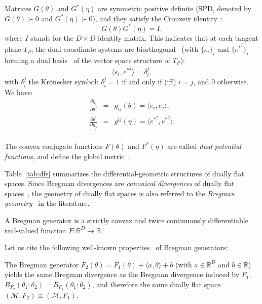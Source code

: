 \documentclass[graybox]{svmult}
\def\inner#1#2{{\langle #1,#2\rangle}}
\def\bbR{\mathbb{R}}
\def\calM{\mathcal{M}}
\begin{document}
Matrices $G(\theta)$ and $G^*(\eta)$ are symmetric positive definite (SPD, denoted by $G(\theta)\succ 0$ and $G^*(\eta)\succ 0$), and 
 they satisfy the Crouzeix identity~\cite{Crouzeix-1977}: 
\begin{equation}
G(\theta)   G^*(\eta) = I,
\end{equation}
where $I$ stands for the $D\times D$ identity matrix.
This indicates that at each tangent plane $T_P$, the dual coordinate systems are biorthogonal~\cite{refduality-2015} (with $\{e_i\}_i$ and
 $\{{e^*}^i\}_i$ forming a dual basis~\cite{tensor-2011} of the vector space structure of $T_P$):
	\begin{equation}
	\inner{e_i}{{e^*}^j}=\delta_i^j,
	\end{equation}
 with $\delta_i^j$ the Kr\"onecker symbol: $\delta_i^j=1$ if and only if (iff) $i=j$, and $0$ otherwise.
We have:
	\begin{eqnarray}
	\frac{\partial \eta_i}{\partial\theta^j}&=&g_{ij}(\theta)=\inner{e_i}{e_j},\\
\frac{\partial \theta^i}{\partial\eta_j}&=&g^{ij}(\eta)=\inner{{e^*}^i}{{e^*}^j}.\\
\end{eqnarray}

	The convex conjugate functions $F(\theta)$ and $F^*(\eta)$ are called {\em dual potential functions}, and define the global metric~\cite{HIG-2007}.
	
	
Table~\ref{tab:dfs} summarizes the differential-geometric structures of dually flat spaces.
Since Bregman divergences are {\em canonical divergences} of dually flat spaces~\cite{IG-2016}, the geometry of dually flat spaces is also  referred to the {\em Bregman geometry}~\cite{Dawid-2007} in the literature.

\begin{definition} \label{def:bg}
A Bregman generator is a strictly convex and twice continuously differentiable real-valued function $F:\bbR^D \rightarrow \bbR$.
\end{definition}

Let us cite the following well-known properties~\cite{Bregman-2005} of Bregman generators:

\begin{property} \label{prop:bdaffine}
The Bregman generator $F_2(\theta)=F_1(\theta)+\inner{a}{\theta}+b$ (with $a\in\bbR^D$ and $b\in\bbR$) yields the same Bregman divergence as the Bregman divergence induced by $F_1$, $B_{F_2}(\theta_1:\theta_2) =B_{F_1}(\theta_1:\theta_2) $, and therefore the same dually flat space $(\calM,F_2)\cong (\calM,F_1)$.
\end{property}
\end{document}
